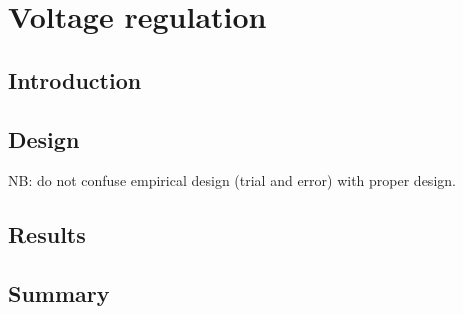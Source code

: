 \chapter{Voltage regulation}\label{ch:voltageRegulation}

\section{Introduction} \label{sec:voltIntro}


\section{Design} \label{sec:voltDesign}
NB: do not confuse empirical design (trial and error) with proper design. 

\section{Results} \label{sec:volt_results}



\section{Summary}\label{sec:temp_summary}



